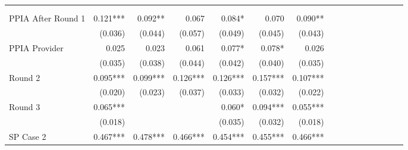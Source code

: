 \begin{tabular}{@{\extracolsep{5pt}}lrrrrrrrrrrrrrrr}
\toprule
& \multicolumn{1}{p{0.13\linewidth}}{\centering{(1)}} & \multicolumn{1}{p{0.13\linewidth}}{\centering{(2)}} & \multicolumn{1}{p{0.13\linewidth}}{\centering{(3)}} & \multicolumn{1}{p{0.13\linewidth}}{\centering{(4)}} & \multicolumn{1}{p{0.13\linewidth}}{\centering{(5)}} & \multicolumn{1}{p{0.13\linewidth}}{\centering{(6)}} \\
& \multicolumn{1}{p{0.13\linewidth}}{\centering{Pooled}} & \multicolumn{1}{p{0.13\linewidth}}{\centering{Diff$-$Diff}} & \multicolumn{1}{p{0.13\linewidth}}{\centering{Sample 1a (DiD)}} & \multicolumn{1}{p{0.13\linewidth}}{\centering{Sample 1a (All)}} & \multicolumn{1}{p{0.13\linewidth}}{\centering{Restricted}} & \multicolumn{1}{p{0.13\linewidth}}{\centering{Separate}} \\
\hline
PPIA After Round 1 & 0.121\phantom{)}*** & 0.092\phantom{)}**\phantom{*} & 0.067\phantom{\phantom{)}***} & 0.084\phantom{)}*\phantom{**} & 0.070\phantom{\phantom{)}***} & 0.090\phantom{)}**\phantom{*} \\
& (0.036)\phantom{***} & (0.044)\phantom{***} & (0.057)\phantom{***} & (0.049)\phantom{***} & (0.045)\phantom{***} & (0.043)\phantom{***} \\
PPIA Provider & 0.025\phantom{\phantom{)}***} & 0.023\phantom{\phantom{)}***} & 0.061\phantom{\phantom{)}***} & 0.077\phantom{)}*\phantom{**} & 0.078\phantom{)}*\phantom{**} & 0.026\phantom{\phantom{)}***} \\
& (0.035)\phantom{***} & (0.038)\phantom{***} & (0.044)\phantom{***} & (0.042)\phantom{***} & (0.040)\phantom{***} & (0.035)\phantom{***} \\
Round 2 & 0.095\phantom{)}*** & 0.099\phantom{)}*** & 0.126\phantom{)}*** & 0.126\phantom{)}*** & 0.157\phantom{)}*** & 0.107\phantom{)}*** \\
& (0.020)\phantom{***} & (0.023)\phantom{***} & (0.037)\phantom{***} & (0.033)\phantom{***} & (0.032)\phantom{***} & (0.022)\phantom{***} \\
Round 3 & 0.065\phantom{)}*** & \phantom{***} & \phantom{***} & 0.060\phantom{)}*\phantom{**} & 0.094\phantom{)}*** & 0.055\phantom{)}*** \\
& (0.018)\phantom{***} & \phantom{***} & \phantom{***} & (0.035)\phantom{***} & (0.032)\phantom{***} & (0.018)\phantom{***} \\
SP Case 2 & 0.467\phantom{)}*** & 0.478\phantom{)}*** & 0.466\phantom{)}*** & 0.454\phantom{)}*** & 0.455\phantom{)}*** & 0.466\phantom{)}*** \\

\end{tabular}
